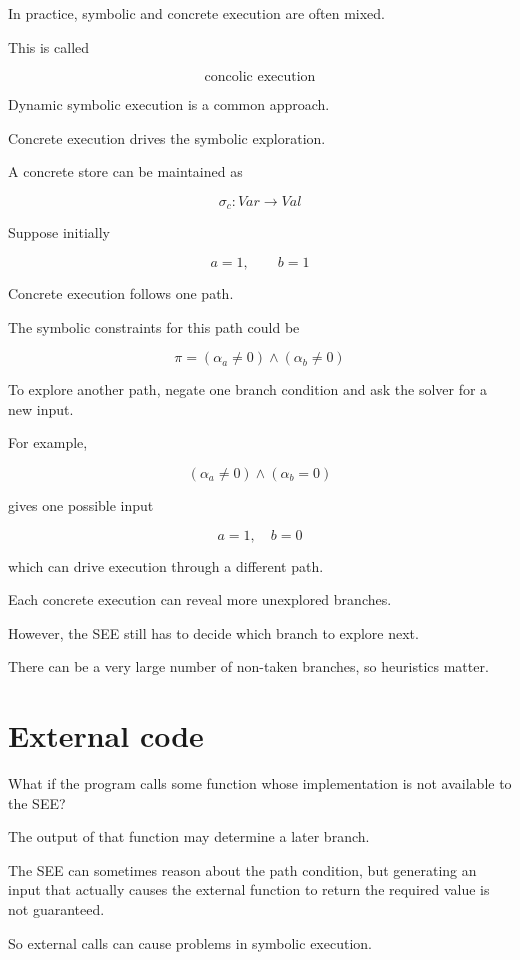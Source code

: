 \documentclass[11pt]{book}
\begin{document}
In practice, symbolic and concrete execution are often
mixed.

This is called

\[
\boxed{\text{concolic execution}}
\]

Dynamic symbolic execution is a common approach.

Concrete execution drives the symbolic exploration.

A concrete store can be maintained as

\[
\sigma_c : Var \rightarrow Val
\]

Suppose initially

\[
a=1,\qquad b=1
\]

Concrete execution follows one path.

The symbolic constraints for this path could be

\[
\pi=(\alpha_a\neq0)\land(\alpha_b\neq0)
\]

To explore another path, negate one branch condition
and ask the solver for a new input.

For example,

\[
(\alpha_a\neq0)\land(\alpha_b=0)
\]

gives one possible input

\[
a=1,\quad b=0
\]

which can drive execution through a different path.

\begin{ppkey}
Each concrete execution can reveal more unexplored
branches.

However, the SEE still has to decide which branch
to explore next.
\end{ppkey}

There can be a very large number of non-taken branches,
so heuristics matter.

\section{External code}

What if the program calls some function whose implementation
is not available to the SEE?

The output of that function may determine a later branch.

The SEE can sometimes reason about the path condition,
but generating an input that actually causes the external
function to return the required value is not guaranteed.

So external calls can cause problems in symbolic execution.
\end{document}
